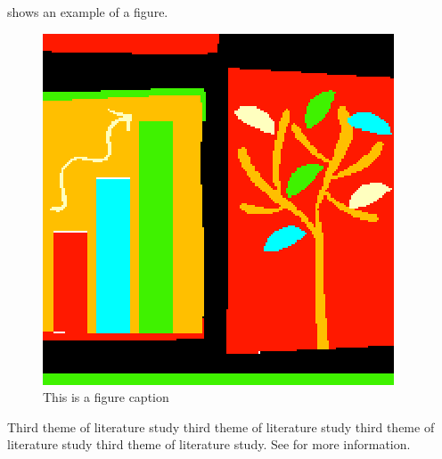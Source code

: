  shows an example of a figure.
\begin{figure}[!ht]
  \centering
  \includegraphics[width=0.4\linewidth]{figures/figure1}
  \caption{This is a figure caption}
  \label{fig:example}
\end{figure}

Third theme of literature study third theme of literature study third
theme of literature study third theme of literature study. See
 for more information.
